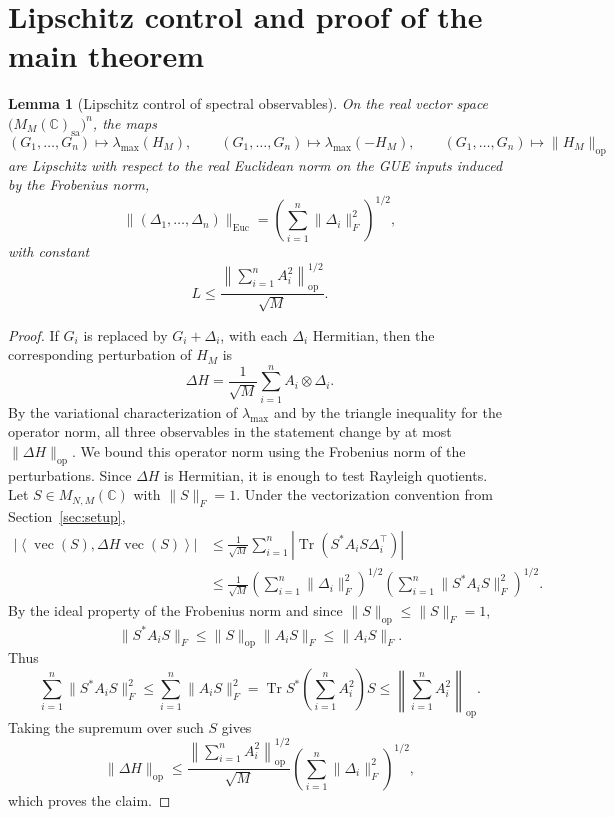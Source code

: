 \documentclass{article}
\newtheorem{lemma}[theorem]{Lemma}
\newcommand{\C}{\mathbb C}
\newcommand{\op}{\mathrm{op}}
\newcommand{\ip}[2]{\left\langle #1,#2\right\rangle}
\newcommand{\Arow}{\left\|\sum_{i=1}^n A_i^2\right\|_{\op}^{1/2}}
\DeclareMathOperator{\Tr}{Tr}
\DeclareMathOperator{\vecop}{vec}
\begin{document}
\section{Lipschitz control and proof of the main theorem}
\label{sec:op-norm}

\begin{lemma}[Lipschitz control of spectral observables]
	\label{lem:spectral-lipschitz}
	On the real vector space
	\(\bigl(M_M(\C)_{\mathrm{sa}}\bigr)^n\), the maps
	\[
		(G_1,\ldots,G_n)\mapsto\lambda_{\max}(H_M),
		\qquad
		(G_1,\ldots,G_n)\mapsto\lambda_{\max}(-H_M),
		\qquad
		(G_1,\ldots,G_n)\mapsto\|H_M\|_{\op}
	\]
	are Lipschitz with respect to the real Euclidean norm on the GUE inputs induced
	by the Frobenius norm,
	\[
		\|(\Delta_1,\ldots,\Delta_n)\|_{\mathrm{Euc}}
		=
		\left(\sum_{i=1}^n\|\Delta_i\|_F^2\right)^{1/2},
	\]
	with constant
	\[
		L
		\le
		\frac{\Arow}{\sqrt M}.
	\]
\end{lemma}

\begin{proof}
	If $G_i$ is replaced by $G_i+\Delta_i$, with each $\Delta_i$ Hermitian, then
	the corresponding perturbation of $H_M$ is
	\[
		\Delta H=
		\frac1{\sqrt M}\sum_{i=1}^n A_i\otimes\Delta_i.
	\]
	By the variational characterization of $\lambda_{\max}$ and by the triangle
	inequality for the operator norm, all three observables in the statement
	change by at most $\|\Delta H\|_{\op}$.  We bound this operator norm using the
	Frobenius norm of the perturbations.  Since $\Delta H$ is Hermitian, it is enough
	to test Rayleigh quotients.  Let $S\in M_{N,M}(\C)$ with $\|S\|_F=1$.  Under the
	vectorization convention from Section~\ref{sec:setup},
	\[
		\begin{aligned}
			\left|
			\ip{\vecop(S)}{\Delta H\vecop(S)}
			\right|
			 & \le
			\frac1{\sqrt M}
			\sum_{i=1}^n
			\left|\Tr(S^*A_iS\Delta_i^{\top})\right| \\
			 & \le
			\frac1{\sqrt M}
			\left(\sum_{i=1}^n\|\Delta_i\|_F^2\right)^{1/2}
			\left(\sum_{i=1}^n\|S^*A_iS\|_F^2\right)^{1/2}.
		\end{aligned}
	\]
	By the ideal property of the Frobenius norm and since
	$\|S\|_{\op}\le\|S\|_F=1$,
	\[
		\|S^*A_iS\|_F\le\|S\|_{\op}\|A_iS\|_F \leq \|A_iS\|_F .
	\]
	Thus
	\[
		\sum_{i=1}^n\|S^*A_iS\|_F^2
		\le
		\sum_{i=1}^n\|A_iS\|_F^2
		=
		\Tr S^*\left(\sum_{i=1}^n A_i^2\right)S
		\le
		\left\|\sum_{i=1}^n A_i^2\right\|_{\op}.
	\]
	Taking the supremum over such $S$ gives
	\[
		\|\Delta H\|_{\op}
		\le
		\frac{\Arow}{\sqrt M}
		\left(\sum_{i=1}^n\|\Delta_i\|_F^2\right)^{1/2},
	\]
	which proves the claim.
\end{proof}
\end{document}
